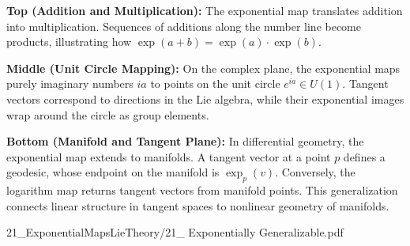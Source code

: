 \begin{SideNotePage}{
  \textbf{Top (Addition and Multiplication):} The exponential map translates addition into multiplication. Sequences of additions along the number line become products, illustrating how $\exp(a+b)=\exp(a)\cdot\exp(b)$. \par
  \textbf{Middle (Unit Circle Mapping):} On the complex plane, the exponential maps purely imaginary numbers $ia$ to points on the unit circle $e^{ia}\in U(1)$. Tangent vectors correspond to directions in the Lie algebra, while their exponential images wrap around the circle as group elements. \par
  \textbf{Bottom (Manifold and Tangent Plane):} In differential geometry, the exponential map extends to manifolds. A tangent vector at a point $p$ defines a geodesic, whose endpoint on the manifold is $\exp_p(v)$. Conversely, the logarithm map returns tangent vectors from manifold points. This generalization connects linear structure in tangent spaces to nonlinear geometry of manifolds. \par
}{21_ExponentialMapsLieTheory/21_ Exponentially Generalizable.pdf}
\end{SideNotePage}
